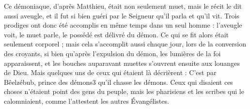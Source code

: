 Ce démoniaque, d’après Matthieu, était non seulement muet, mais le récit le dit aussi aveugle, et il fut si bien guéri par le Seigneur qu’il parla et qu’il vit. Trois prodiges ont donc été accomplis en même temps dans un seul homme : l’aveugle voit, le muet parle, le possédé est délivré du démon. Ce qui se fit alors était seulement corporel ; mais cela s’accomplit aussi chaque jour, lors de la conversion des croyants, si bien qu'après l’expulsion du démon, les lumières de la foi apparaissent, et les bouches auparavant muettes s’ouvrent ensuite aux louanges de Dieu. Mais quelques uns de ceux qui étaient là décrièrent : C’est par Bêelzébub, prince des démons3 qu’il chasse les démons. Ceux qui disaient ces choses n’étaient point des gens du peuple, mais les pharisiens et les scribes qui le calomniaient, comme l’attestent les autres Évangélistes.
